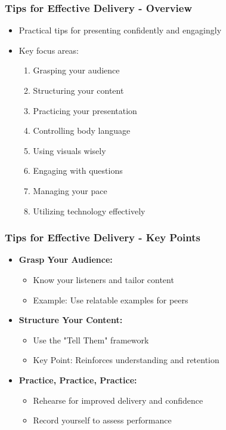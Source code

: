 \documentclass[aspectratio=169]{beamer}
\begin{document}
\begin{frame}[fragile]
    \frametitle{Tips for Effective Delivery - Overview}
    \begin{itemize}
        \item Practical tips for presenting confidently and engagingly
        \item Key focus areas:
        \begin{enumerate}
            \item Grasping your audience
            \item Structuring your content
            \item Practicing your presentation
            \item Controlling body language
            \item Using visuals wisely
            \item Engaging with questions
            \item Managing your pace
            \item Utilizing technology effectively
        \end{enumerate}
    \end{itemize}
\end{frame}

\begin{frame}[fragile]
    \frametitle{Tips for Effective Delivery - Key Points}
    \begin{itemize}
        \item \textbf{Grasp Your Audience:}
        \begin{itemize}
            \item Know your listeners and tailor content
            \item Example: Use relatable examples for peers
        \end{itemize}

        \item \textbf{Structure Your Content:}
        \begin{itemize}
            \item Use the "Tell Them" framework
            \item Key Point: Reinforces understanding and retention
        \end{itemize}
        
        \item \textbf{Practice, Practice, Practice:}
        \begin{itemize}
            \item Rehearse for improved delivery and confidence
            \item Record yourself to assess performance
        \end{itemize}
    \end{itemize}
\end{frame}
\end{document}
